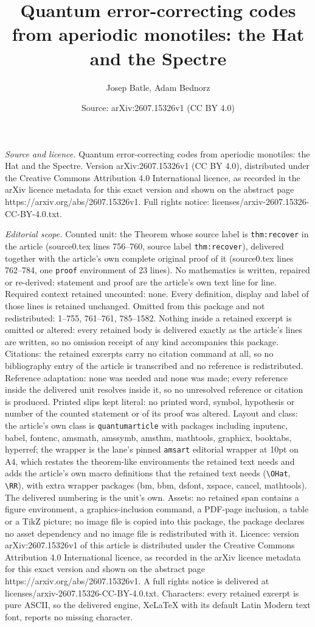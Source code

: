 \documentclass[10pt,a4paper]{amsart}
\title[Quantum error-correcting codes from aperiodic monotiles: the]{Quantum error-correcting codes from aperiodic monotiles: the Hat and the Spectre}
\author{Josep Batle, Adam Bednorz}
\date{Source: arXiv:2607.15326v1 (CC BY 4.0)}
\begin{document}
\maketitle

\noindent\emph{Source and licence.} Quantum error-correcting codes from aperiodic monotiles: the Hat and the Spectre. Version arXiv:2607.15326v1 (CC BY 4.0), distributed under the Creative Commons Attribution 4.0 International licence, as recorded in the arXiv licence metadata for this exact version and shown on the abstract page https://arxiv.org/abs/2607.15326v1. Full rights notice: licenses/arxiv-2607.15326-CC-BY-4.0.txt.\par\smallskip

\noindent\textit{Editorial scope.} Counted unit: the Theorem whose source label is \texttt{thm:recover} in the article (source0.tex lines 756--760, source label \texttt{thm:recover}), delivered together with the article's own complete original proof of it (source0.tex lines 762--784, one \texttt{proof} environment of 23 lines). No mathematics is written, repaired or re-derived: statement and proof are the article's own text line for line. Required context retained uncounted: none. Every definition, display and label of those lines is retained unchanged. Omitted from this package and not redistributed: 1--755, 761--761, 785--1582. Nothing inside a retained excerpt is omitted or altered: every retained body is delivered exactly as the article's lines are written, so no omission receipt of any kind accompanies this package. Citations: the retained excerpts carry no citation command at all, so no bibliography entry of the article is transcribed and no reference is redistributed. Reference adaptation: none was needed and none was made; every reference inside the delivered unit resolves inside it, so no unresolved reference or citation is produced. Printed slips kept literal: no printed word, symbol, hypothesis or number of the counted statement or of its proof was altered. Layout and class: the article's own class is \texttt{quantumarticle} with packages including inputenc, babel, fontenc, amsmath, amssymb, amsthm, mathtools, graphicx, booktabs, hyperref; the wrapper is the lane's pinned \texttt{amsart} editorial wrapper at 10pt on A4, which restates the theorem-like environments the retained text needs and adds the article's own macro definitions that the retained text needs (\texttt{\textbackslash OHat}, \texttt{\textbackslash RR}), with extra wrapper packages (bm, bbm, dsfont, xspace, cancel, mathtools). The delivered numbering is the unit's own. Assets: no retained span contains a figure environment, a graphics-inclusion command, a PDF-page inclusion, a table or a TikZ picture; no image file is copied into this package, the package declares no asset dependency and no image file is redistributed with it. Licence: version arXiv:2607.15326v1 of this article is distributed under the Creative Commons Attribution 4.0 International licence, as recorded in the arXiv licence metadata for this exact version and shown on the abstract page https://arxiv.org/abs/2607.15326v1. A full rights notice is delivered at licenses/arxiv-2607.15326-CC-BY-4.0.txt. Characters: every retained excerpt is pure ASCII, so the delivered engine, XeLaTeX with its default Latin Modern text font, reports no missing character.
\end{document}
